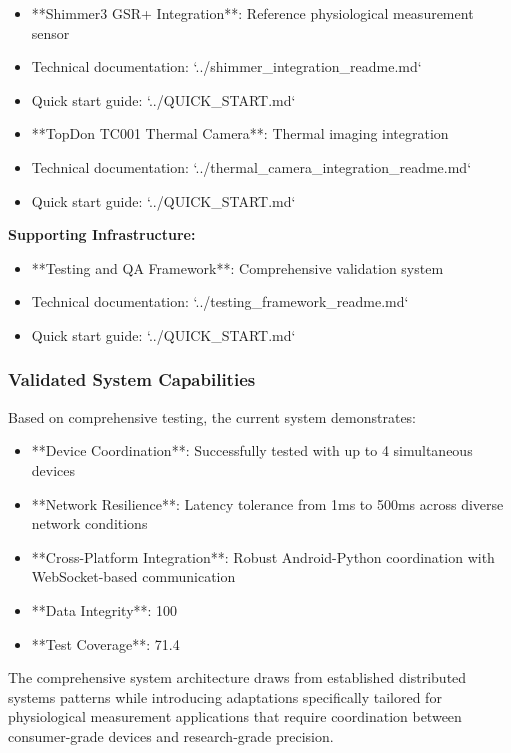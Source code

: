\documentclass[12pt,a4paper]{report}
\begin{document}
\begin{itemize}
\item **Shimmer3 GSR+ Integration**: Reference physiological measurement sensor
\item Technical documentation: `../shimmer_integration_readme.md`
\item Quick start guide: `../QUICK_START.md`

\item **TopDon TC001 Thermal Camera**: Thermal imaging integration
\item Technical documentation: `../thermal_camera_integration_readme.md`
\item Quick start guide: `../QUICK_START.md`

\end{itemize}
\textbf{Supporting Infrastructure:}

\begin{itemize}
\item **Testing and QA Framework**: Comprehensive validation system
\item Technical documentation: `../testing_framework_readme.md`
\item Quick start guide: `../QUICK_START.md`

\end{itemize}
\subsubsection{Validated System Capabilities}

Based on comprehensive testing, the current system demonstrates:

\begin{itemize}
\item **Device Coordination**: Successfully tested with up to 4 simultaneous devices
\item **Network Resilience**: Latency tolerance from 1ms to 500ms across diverse network conditions
\item **Cross-Platform Integration**: Robust Android-Python coordination with WebSocket-based communication
\item **Data Integrity**: 100%
\item **Test Coverage**: 71.4%

\end{itemize}
The comprehensive system architecture draws from established distributed systems patterns while introducing adaptations
specifically tailored for physiological measurement applications that require coordination between consumer-grade
devices and research-grade precision.
\end{document}
